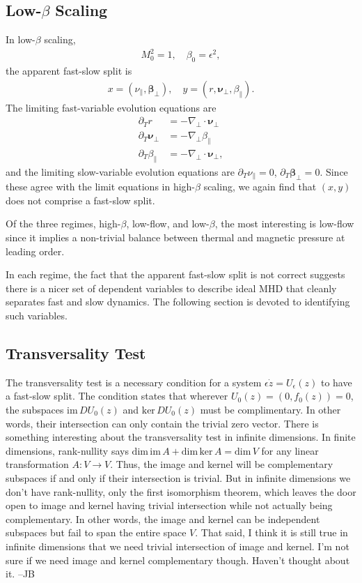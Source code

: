 \documentclass{article}
\newcommand{\ep}{\epsilon}
\newcommand{\np}{\nabla_\perp}
\begin{document}
\subsection{Low-$\beta$ Scaling}
In low-$\beta$ scaling,
\begin{align*}
    M_0^2 = 1,\quad \beta_0 = \ep^2,
\end{align*}
the apparent fast-slow split is
\begin{align*}
x = (\nu_\parallel,\bm{\beta}_\perp),\quad y = (r,\bm{\nu}_\perp,\beta_\parallel).
\end{align*}
The limiting fast-variable evolution equations are
\begin{align*}
\partial_Tr &= -\np\cdot\bm{\nu}_\perp\\
\partial_T\bm{\nu}_\perp & = -\np\beta_\parallel\\
\partial_T\beta_\parallel & = -\np\cdot\bm{\nu}_\perp,
\end{align*}
and the limiting slow-variable evolution equations are $\partial_T\nu_\parallel = 0$, $\partial_T\bm{\beta}_\perp = 0$. Since these agree with the limit equations in high-$\beta$ scaling, we again find that $(x,y)$ does not comprise a fast-slow split.

Of the three regimes, high-$\beta$, low-flow, and low-$\beta$, the most interesting is low-flow since it implies a non-trivial balance between thermal and magnetic pressure at leading order.

In each regime, the fact that the apparent fast-slow split is not correct suggests there is a nicer set of dependent variables to describe ideal MHD that cleanly separates fast and slow dynamics. The following section is devoted to identifying such variables.

\subsection{Transversality Test}
The transversality test is a necessary condition for a system $\ep \dot{z} = U_\ep(z)$ to have a fast-slow split. The condition states that wherever $U_0(z) = (0, f_0(z)) = 0$, the subspaces $\text{im}\,DU_0(z)$ and $\text{ker}\,DU_0(z)$ must be complimentary. In other words, their intersection can only contain the trivial zero vector. {\color{red}There is something interesting about the transversality test in infinite dimensions. In finite dimensions, rank-nullity says $\text{dim}\,\text{im}\,A + \text{dim}\,\text{ker}\,A = \text{dim}\,V $ for any linear transformation $A:V\rightarrow V$. Thus, the image and kernel will be complementary subspaces if and only if their intersection is trivial. But in infinite dimensions we don't have rank-nullity, only the first isomorphism theorem, which leaves the door open to image and kernel having trivial intersection while not actually being complementary. In other words, the image and kernel can be independent subspaces but fail to span the entire space $V$. That said, I think it is still true in infinite dimensions that we need trivial intersection of image and kernel. I'm not sure if we need image and kernel complementary though. Haven't thought about it. --JB}
\end{document}
